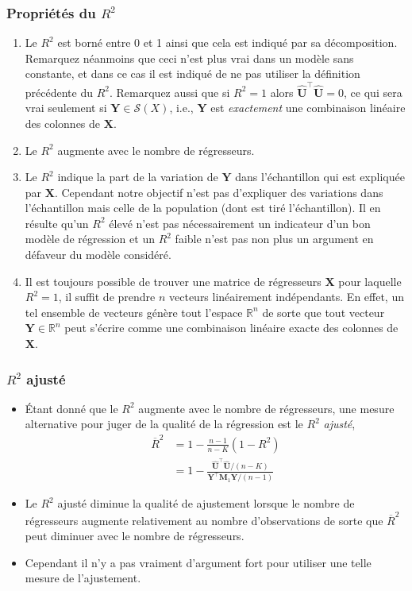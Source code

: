 \begin{frame}[allowframebreaks]\frametitle{Propriétés du $R^2$}
\begin{enumerate}
\item Le $R^2$ est borné entre 0 et 1 ainsi que cela est indiqué par sa décomposition. Remarquez néanmoins que ceci n'est plus vrai dans un modèle sans constante, et dans ce cas il est indiqué de ne pas utiliser la définition précédente du $R^2$. Remarquez aussi que si $R^2 =  1$ alors $\widehat{\mathbf{U}}^\top\widehat{\mathbf{U}} = 0$, ce qui sera vrai seulement si $\mathbf{Y}\in \mathcal{S}(X)$, i.e., $\mathbf{Y}$ est \emph{exactement} une combinaison linéaire des colonnes de $\mathbf{X}$.
\item Le $R^2$ augmente avec le nombre de régresseurs. 
\item Le $R^2$ indique la part de la variation de $\mathbf{Y}$ dans l'échantillon qui est expliquée par $\mathbf{X}$. Cependant notre objectif n'est pas d'expliquer des variations dans l'échantillon mais celle de la population (dont est tiré l'échantillon). Il en résulte qu'un $R^2$ élevé n'est pas nécessairement un indicateur d'un bon modèle de régression et un $R^2$ faible n'est pas non plus un argument en défaveur du modèle considéré.
\item Il est toujours possible de trouver une matrice de régresseurs $\mathbf{X}$ pour laquelle $R^2 = 1$, il suffit de prendre $n$ vecteurs linéairement indépendants. En effet, un tel ensemble de vecteurs génère tout l'espace $\mathbb{R}^n$ de sorte que tout vecteur $\mathbf{Y}\in\mathbb{R}^n$ peut s'écrire comme une combinaison linéaire exacte des colonnes de $\mathbf{X}$.
\end{enumerate}
\end{frame}


\begin{frame}[allowframebreaks]\frametitle{$R^2$ ajusté}
\begin{itemize}
\item \'Etant donné que le $R^2$ augmente avec le nombre de régresseurs, une mesure alternative pour juger de la qualité de la régression est le $R^2$ \emph{ajusté},
\begin{align*}
\overline{R}^2 &= 1 - \frac{n-1}{n-K}(1 - R^2)\\
& = 1 - \frac{\widehat{\mathbf{U}}^\top\widehat{\mathbf{U}}/(n-K)}{\mathbf{Y}^\top\mathbf{M}_1\mathbf{Y}/(n-1)}
\end{align*}
\item Le $R^2$ ajusté diminue la qualité de ajustement lorsque le nombre de régresseurs augmente relativement au nombre d'observations de sorte que $\overline{R}^2 $ peut diminuer avec le nombre de régresseurs. 
\item Cependant il n'y a pas vraiment d'argument fort pour utiliser une telle mesure de l'ajustement.
\end{itemize}
\end{frame}

